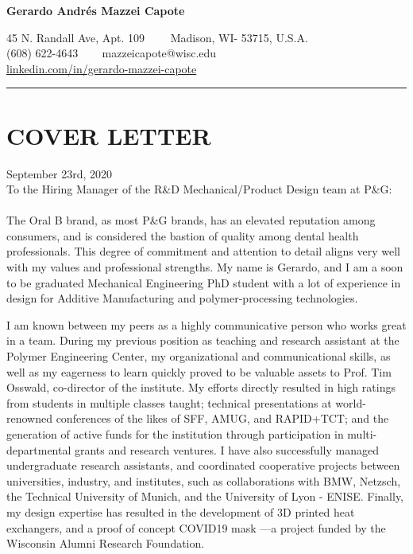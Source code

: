 \documentclass[12pt,letterpaper]{article}
\begin{document}
\begin{center}
	{\LARGE \textbf{Gerardo Andrés Mazzei Capote}}

	45 N. Randall Ave, Apt. 109\ \ \textbullet
	\ \ Madison, WI- 53715, U.S.A.
	\\
	(608) 622-4643 \ \textbullet
	\ \ mazzeicapote@wisc.edu\\
	\href{https://www.linkedin.com/in/gerardo-mazzei-capote}{linkedin.com/in/gerardo-mazzei-capote}
	
\end{center}
\vspace{-0.5em}
\hrule
\vspace{0.4em}
\vspace{-1em}

\section*{COVER LETTER}
\vspace{0.4em}
September 23rd, 2020
\\
To the Hiring Manager of the R\&D Mechanical/Product Design team at P\&G:
\\
\\
The Oral B brand, as most P\&G brands, has an elevated reputation among consumers, and is considered the bastion of quality among dental health professionals. This degree of commitment and attention to detail aligns very well with my values and professional strengths. My name is Gerardo, and I am a soon to be graduated Mechanical Engineering PhD student with a lot of experience in design for Additive Manufacturing and polymer-processing technologies.

I am known between my peers as a highly communicative person who works great in a team. During my previous position as teaching and research assistant at the Polymer Engineering Center, my organizational and communicational skills, as well as my eagerness to learn quickly proved to be valuable assets to Prof. Tim Osswald, co-director of the institute. My efforts directly resulted in high ratings from students in multiple classes taught; technical presentations at world-renowned conferences of the likes of SFF, AMUG, and RAPID+TCT; and the generation of active funds for the institution through participation in multi-departmental grants and research ventures. I have also successfully managed undergraduate research assistants, and coordinated cooperative projects between universities, industry, and institutes, such as collaborations with BMW, Netzsch, the Technical University of Munich, and the University of Lyon - ENISE. Finally, my design expertise has resulted in the development of 3D printed heat exchangers, and a proof of concept COVID19 mask ---a project funded by the Wisconsin Alumni Research Foundation.
\end{document}
